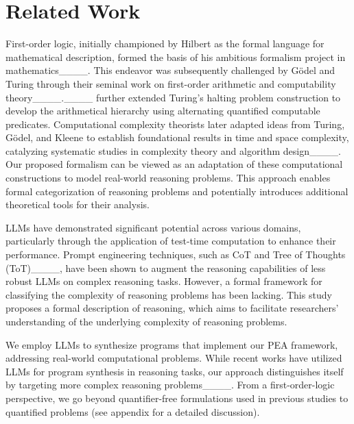 \section{Related Work}
First-order logic, initially championed by Hilbert as the formal language for mathematical description, formed the basis of his ambitious formalism project in mathematics____. This endeavor was subsequently challenged by Gödel and Turing through their seminal work on first-order arithmetic and computability theory____.____ further extended Turing's halting problem construction to develop the arithmetical hierarchy using alternating quantified computable predicates. Computational complexity theorists later adapted ideas from Turing, Gödel, and Kleene to establish foundational results in time and space complexity, catalyzing systematic studies in complexity theory and algorithm design____. Our proposed formalism can be viewed as an adaptation of these computational constructions to model real-world reasoning problems. This approach enables formal categorization of reasoning problems and potentially introduces additional theoretical tools for their analysis.

LLMs have demonstrated significant potential across various domains, particularly through the application of test-time computation to enhance their performance. Prompt engineering techniques, such as CoT and Tree of Thoughts (ToT)____, have been shown to augment the reasoning capabilities of less robust LLMs on complex reasoning tasks. However, a formal framework for
classifying
the complexity of reasoning problems has been lacking. This study proposes a formal description of reasoning, which aims to facilitate researchers' understanding of the underlying complexity of reasoning problems.

We employ LLMs to synthesize programs that implement our PEA framework, addressing real-world computational problems. While recent works have utilized LLMs for program synthesis in reasoning tasks, our approach distinguishes itself by targeting more complex reasoning problems____. From a first-order-logic perspective, we 
go beyond quantifier-free formulations used in
previous studies to quantified problems (see appendix for a detailed discussion).

